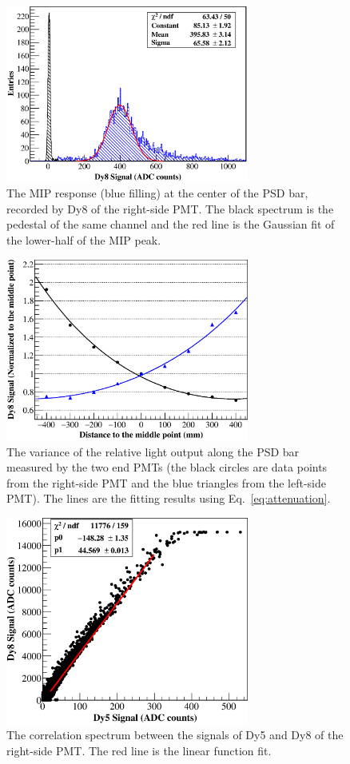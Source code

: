 \documentclass[preprint, times]{elsarticle}
\begin{document}
\begin{figure}[h]
	\centering
	\includegraphics[width=80mm]{mip}
	\caption{The MIP response (blue filling) at the center of the PSD bar, recorded by Dy8 of the right-side PMT. The black spectrum is the pedestal of the same channel and the red line is the Gaussian fit of the lower-half of the MIP peak.}
	\label{fig:mip}
\end{figure}

\begin{figure}[h]
	\centering
	\includegraphics[width=80mm]{attenuation}
	\caption{The variance of the relative light output along the PSD bar measured by the two end PMTs (the black circles are data points from the right-side PMT and the blue triangles from the left-side PMT). The lines are the fitting results using Eq.~\ref{eq:attenuation}.}
	\label{fig:attenuation}
\end{figure}

\begin{figure}[h]
	\centering
	\includegraphics[width=80mm]{dy58}
	\caption{The correlation spectrum between the signals of Dy5 and Dy8 of the right-side PMT. The red line is the linear function fit.}
	\label{fig:dy58}
\end{figure}
\end{document}
